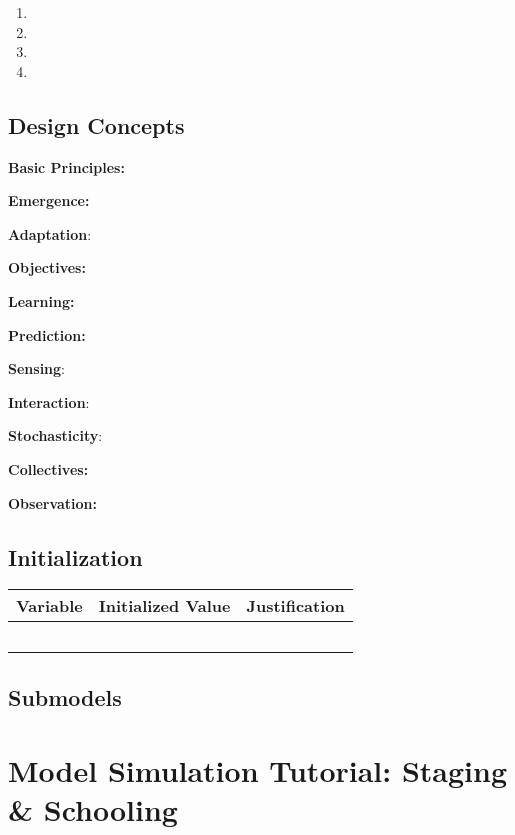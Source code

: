 \documentclass[
]{book}
\providecommand{\tightlist}{%
  \setlength{\itemsep}{0pt}\setlength{\parskip}{0pt}}
\begin{document}
\begin{enumerate}
\def\labelenumi{\arabic{enumi}.}
\tightlist
\item
\item
\item
\item
\end{enumerate}

\section{Design Concepts}\label{design-concepts-10}

\textbf{Basic Principles:}

\textbf{Emergence:}

\textbf{Adaptation}:

\textbf{Objectives:}

\textbf{Learning:}

\textbf{Prediction:}

\textbf{Sensing}:

\textbf{Interaction}:

\textbf{Stochasticity}:

\textbf{Collectives:}

\textbf{Observation:}

\section{Initialization}\label{initialization-10}

\begin{longtable}[]{@{}ccc@{}}
\toprule\noalign{}
Variable & Initialized Value & Justification \\
\midrule\noalign{}
\endhead
\bottomrule\noalign{}
\endlastfoot
& & \\
& & \\
& & \\
& & \\
& & \\
\end{longtable}

\section{Submodels}\label{submodels-10}

\chapter{Model Simulation Tutorial: Staging \& Schooling}\label{model-simulation-tutorial-staging-schooling}
\end{document}
